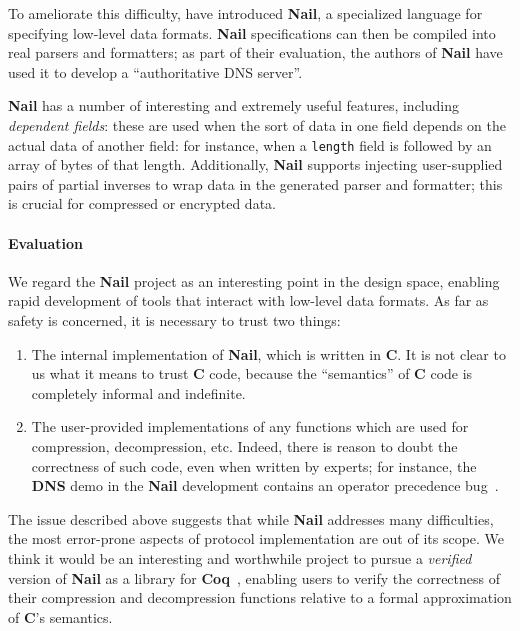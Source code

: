 \documentclass{article}
\newcommand\Kwd[1]{{\sffamily\bfseries{#1}}}
\begin{document}
To ameliorate this difficulty, \citeauthor{bangert:2014} have
introduced \Kwd{Nail}, a specialized language for specifying low-level
data formats. \Kwd{Nail} specifications can then be compiled into real
parsers and formatters; as part of their evaluation, the authors of
\Kwd{Nail} have used it to develop a ``authoritative DNS server''.

\Kwd{Nail} has a number of interesting and extremely useful features,
including \emph{dependent fields}: these are used when the sort of
data in one field depends on the actual data of another field: for
instance, when a \verb|length| field is followed by an array of bytes
of that length.
%
Additionally, \Kwd{Nail} supports injecting user-supplied pairs of
partial inverses to wrap data in the generated parser and formatter;
this is crucial for compressed or encrypted data.

\paragraph{Evaluation}

We regard the \Kwd{Nail} project as an interesting point in the design
space, enabling rapid development of tools that interact with
low-level data formats. As far as safety is concerned, it is necessary
to trust two things:

\begin{enumerate}
\item The internal implementation of \Kwd{Nail}, which is written in
  \Kwd{C}. It is not clear to us what it means to trust \Kwd{C} code,
  because the ``semantics'' of \Kwd{C} code is completely informal and
  indefinite.
\item The user-provided implementations of any functions which are
  used for compression, decompression, etc. Indeed, there is reason to
  doubt the correctness of such code, even when written by experts;
  for instance, the \Kwd{DNS} demo in the \Kwd{Nail} development
  contains an operator precedence bug~\citep{nigeltao:ticket}.
\end{enumerate}

The issue described above suggests that while \Kwd{Nail} addresses
many difficulties, the most error-prone aspects of protocol
implementation are out of its scope. We think it would be an
interesting and worthwhile project to pursue a \emph{verified} version
of \Kwd{Nail} as a library for \Kwd{Coq}~\citep{coq:reference-manual},
enabling users to verify the correctness of their compression and
decompression functions relative to a formal approximation of
\Kwd{C}'s semantics.
\end{document}
